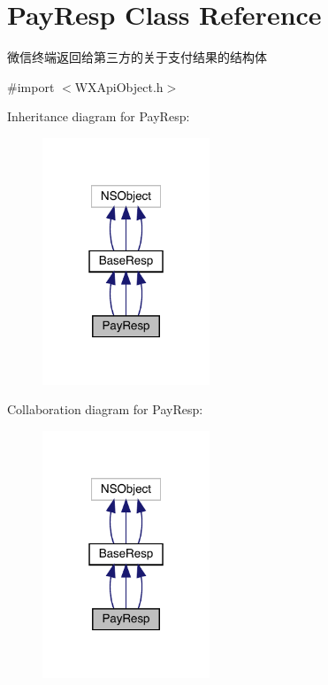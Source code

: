 \hypertarget{interface_pay_resp}{}\section{Pay\+Resp Class Reference}
\label{interface_pay_resp}


微信终端返回给第三方的关于支付结果的结构体  




{\ttfamily \#import $<$W\+X\+Api\+Object.\+h$>$}



Inheritance diagram for Pay\+Resp\+:\nopagebreak
\begin{figure}[H]
\begin{center}
\leavevmode
\includegraphics[width=142pt]{interface_pay_resp__inherit__graph}
\end{center}
\end{figure}


Collaboration diagram for Pay\+Resp\+:\nopagebreak
\begin{figure}[H]
\begin{center}
\leavevmode
\includegraphics[width=142pt]{interface_pay_resp__coll__graph}
\end{center}
\end{figure}
